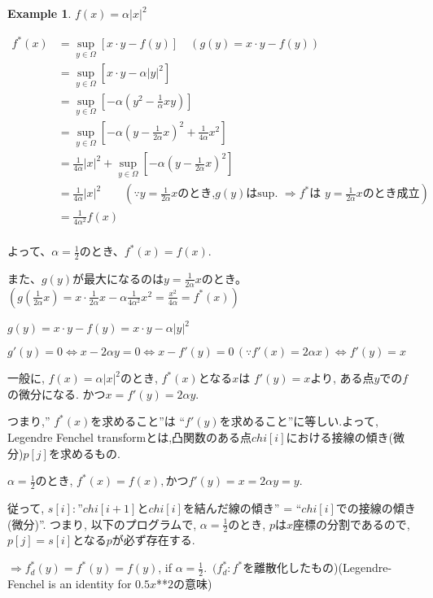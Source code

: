 \documentclass{jsarticle}
\theoremstyle{definition}
\newtheorem{ex}{Example}[section]
\begin{document}
\begin{ex}

$f(x) = \alpha |x|^2$


\begin{align*}
f^*(x) &= \displaystyle \sup_{y\in \Omega}{[x \cdot y - f(y)]} \quad (g(y) = x \cdot y - f(y))\\
           &=\displaystyle \sup_{y\in \Omega}{[x \cdot y - \alpha |y|^2]}\\
           &= \displaystyle \sup_{y\in \Omega}{[- \alpha(y^2 - \frac{1}{\alpha}xy)]}\\
           &= \displaystyle \sup_{y\in \Omega}{[- \alpha(y - \frac{1}{2 \alpha}x)^2 +  \frac{1}{4 \alpha}x^2]}\\
           &=  \frac{1}{4 \alpha}|x|^2 + \sup_{y\in \Omega}{[- \alpha(y - \frac{1}{2 \alpha}x)^2]}\\
           &= \frac{1}{4 \alpha}|x|^2 \qquad (\because  \text{$y = \frac{1}{2 \alpha}x$のとき,$g(y)$はsup.  $\Rightarrow f^*$は $y = \frac{1}{2 \alpha}x$のとき成立})\\
           &= \frac{1}{4 \alpha^2}f(x)\\
\end{align*}

よって、\color{red}$\alpha = \frac{1}{2}$のとき、$f^*(x) = f(x).$ \color{black}

また、$g(y)$が最大になるのは$y = \frac{1}{2 \alpha}x$のとき。$(g( \frac{1}{2 \alpha}x) = x \cdot \frac{1}{2 \alpha}x - \alpha  \frac{1}{4 \alpha^2}x^2 =  \frac{x^2}{4 \alpha} = f^*(x))$

$g(y) = x \cdot y - f(y)= x \cdot y - \alpha |y|^2$

$g'(y) = 0 \Leftrightarrow x - 2 \alpha y = 0 \Leftrightarrow x - f'(y) = 0 \, (\because f'(x) = 2 \alpha x) \Leftrightarrow f'(y) = x$

\color{red}一般に, $f(x) = \alpha |x| ^2$のとき, $f^*(x)$となる$x$は $f'(y) = x$より, ある点$y$での$f$の微分になる. かつ$x = f'(y) = 2\alpha y. $

つまり,'' $f^*(x)$を求めること''は ``$f'(y)$を求めること''に等しい.よって, Legendre Fenchel transformとは,凸関数のある点$chi[i]$における接線の傾き(微分)$p[j]$を求めるもの.
\color{black}

$\alpha = \frac{1}{2}$のとき, $f^*(x) = f(x),  かつf'(y) = x = 2\alpha y = y$.

従って, $s[i]: $''$chi[i+1]$と$chi[i]$を結んだ線の傾き'' = ``$chi[i]$での接線の傾き(微分)''.
つまり, 以下のプログラムで, $\alpha = \frac{1}{2}$のとき, $p$は$x$座標の分割であるので, $p[j] = s[i]$となる$p$が必ず存在する.

$\Rightarrow f^*_d(y) = f^*(y) = f(y)$, if $\alpha = \frac{1}{2}$. $\,  (f^*_d: f^*$を離散化したもの)(Legendre-Fenchel is an identity for $0.5 x$**$2$の意味)
\end{ex}
\end{document}
